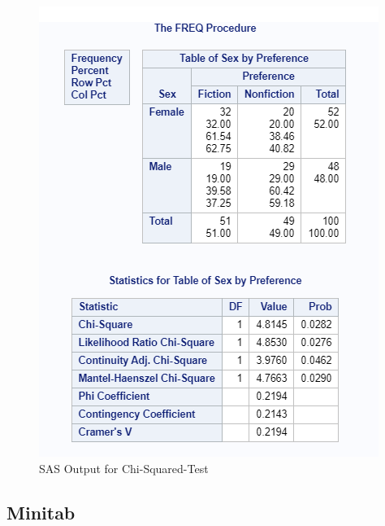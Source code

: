 \documentclass[
]{book}
\begin{document}
\begin{figure}[!h]
\includegraphics{Screenshots/Chi Squared/ChiSquaredSAS} \caption{\label{fig:cstSAS}SAS Output for Chi-Squared-Test}\label{fig:cstSAS}
\end{figure}

\hypertarget{minitab-2}{%
\subsection{Minitab}\label{minitab-2}}
\end{document}
